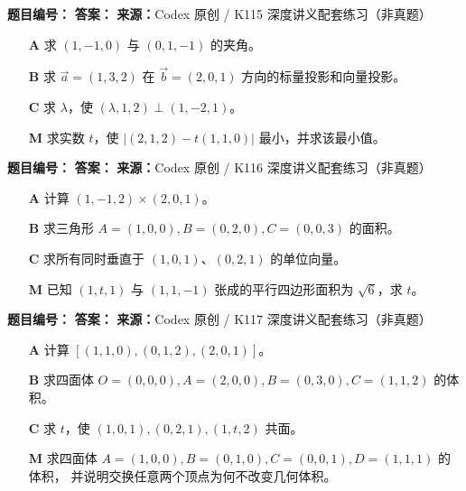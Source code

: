 \begin{problemBox}
\begin{problemMeta}
\textbf{题目编号：} \quad
\textbf{答案：} \quad
\textbf{来源：}Codex 原创 / K115 深度讲义配套练习（非真题）
\end{problemMeta}
\begin{enumerate}
  \item[\textbf{A}] 求 \((1,-1,0)\) 与 \((0,1,-1)\) 的夹角。
  \item[\textbf{B}] 求 \(\vec a=(1,3,2)\) 在
  \(\vec b=(2,0,1)\) 方向的标量投影和向量投影。
  \item[\textbf{C}] 求 \(\lambda\)，使
  \((\lambda,1,2)\perp(1,-2,1)\)。
  \item[\textbf{M}] 求实数 \(t\)，使
  \(|(2,1,2)-t(1,1,0)|\) 最小，并求该最小值。
\end{enumerate}
\end{problemBox}

\begin{problemBox}
\begin{problemMeta}
\textbf{题目编号：} \quad
\textbf{答案：} \quad
\textbf{来源：}Codex 原创 / K116 深度讲义配套练习（非真题）
\end{problemMeta}
\begin{enumerate}
  \item[\textbf{A}] 计算
  \((1,-1,2)\times(2,0,1)\)。
  \item[\textbf{B}] 求三角形
  \(A=(1,0,0),B=(0,2,0),C=(0,0,3)\) 的面积。
  \item[\textbf{C}] 求所有同时垂直于
  \((1,0,1)\)、\((0,2,1)\) 的单位向量。
  \item[\textbf{M}] 已知 \((1,t,1)\) 与 \((1,1,-1)\)
  张成的平行四边形面积为 \(\sqrt6\)，求 \(t\)。
\end{enumerate}
\end{problemBox}

\begin{problemBox}
\begin{problemMeta}
\textbf{题目编号：} \quad
\textbf{答案：} \quad
\textbf{来源：}Codex 原创 / K117 深度讲义配套练习（非真题）
\end{problemMeta}
\begin{enumerate}
  \item[\textbf{A}] 计算
  \([(1,1,0),(0,1,2),(2,0,1)]\)。
  \item[\textbf{B}] 求四面体
  \(O=(0,0,0),A=(2,0,0),B=(0,3,0),C=(1,1,2)\) 的体积。
  \item[\textbf{C}] 求 \(t\)，使
  \((1,0,1),(0,2,1),(1,t,2)\) 共面。
  \item[\textbf{M}] 求四面体
  \(A=(1,0,0),B=(0,1,0),C=(0,0,1),D=(1,1,1)\) 的体积，
  并说明交换任意两个顶点为何不改变几何体积。
\end{enumerate}
\end{problemBox}

